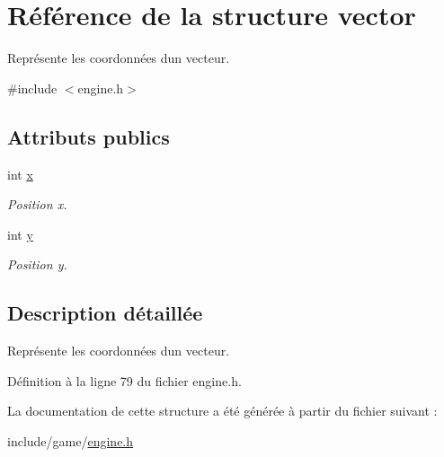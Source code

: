 \hypertarget{structvector}{}\section{Référence de la structure vector}
\label{structvector}


Représente les coordonnées d\textquotesingle{}un vecteur.  




{\ttfamily \#include $<$engine.\+h$>$}

\subsection*{Attributs publics}
\begin{DoxyCompactItemize}
\item 
\hypertarget{structvector_a0403eb3aea23a3009e276fba1d317046}{}int \hyperlink{structvector_a0403eb3aea23a3009e276fba1d317046}{x}\label{structvector_a0403eb3aea23a3009e276fba1d317046}

\begin{DoxyCompactList}\small\item\em Position x. \end{DoxyCompactList}\item 
\hypertarget{structvector_aad6de640298eae97ca0a094db5aff477}{}int \hyperlink{structvector_aad6de640298eae97ca0a094db5aff477}{y}\label{structvector_aad6de640298eae97ca0a094db5aff477}

\begin{DoxyCompactList}\small\item\em Position y. \end{DoxyCompactList}\end{DoxyCompactItemize}


\subsection{Description détaillée}
Représente les coordonnées d\textquotesingle{}un vecteur. 

Définition à la ligne 79 du fichier engine.\+h.



La documentation de cette structure a été générée à partir du fichier suivant \+:\begin{DoxyCompactItemize}
\item 
include/game/\hyperlink{engine_8h}{engine.\+h}\end{DoxyCompactItemize}
